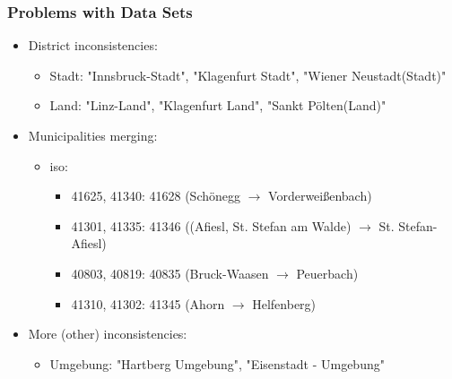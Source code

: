 \documentclass{beamer}
\begin{document}
\begin{frame}
\frametitle{Problems with Data Sets}
\begin{itemize}
\item District inconsistencies:
    \begin{itemize}
    \item Stadt: "Innsbruck-Stadt", "Klagenfurt Stadt", "Wiener Neustadt(Stadt)"
    \item Land: "Linz-Land", "Klagenfurt Land", "Sankt Pölten(Land)"
    \end{itemize}
\item Municipalities merging:
    \begin{itemize}
        \item iso:
        \begin{itemize}
            \item 41625, 41340: 41628 (Schönegg $\rightarrow$ Vorderweißenbach)
            \item 41301, 41335: 41346 ((Afiesl, St. Stefan am Walde) $\rightarrow$ St. Stefan-Afiesl)
            \item 40803, 40819: 40835 (Bruck-Waasen $\rightarrow$ Peuerbach)
            \item 41310, 41302: 41345 (Ahorn $\rightarrow$ Helfenberg)
        \end{itemize}
    \end{itemize}
\item More (other) inconsistencies:
    \begin{itemize}
    \item Umgebung: "Hartberg Umgebung", "Eisenstadt - Umgebung"
    \end{itemize}
\end{itemize}
\end{frame}
\end{document}
